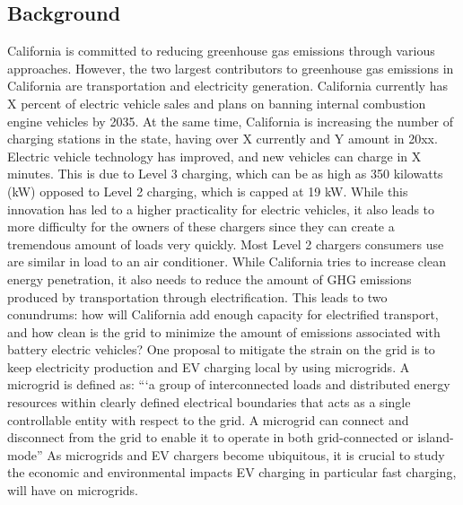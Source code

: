 \documentclass[conference]{IEEEtran}
\begin{document}
    \subsection{Background}
	California is committed to reducing greenhouse gas emissions through various approaches. However, the two largest contributors to greenhouse gas emissions in California are transportation and electricity generation. California currently has X percent of electric vehicle sales and plans on banning internal combustion engine vehicles by 2035. At the same time, California is increasing the number of charging stations in the state, having over X currently and Y amount in 20xx. Electric vehicle technology has improved, and new vehicles can charge in X minutes. This is due to Level 3 charging, which can be as high as 350 kilowatts (kW) opposed to Level 2 charging, which is capped at 19 kW. While this innovation has led to a higher practicality for electric vehicles, it also leads to more difficulty for the owners of these chargers since they can create a tremendous amount of loads very quickly. Most Level 2 chargers consumers use are similar in load to an air conditioner. While California tries to increase clean energy penetration, it also needs to reduce the amount of GHG emissions produced by transportation through electrification. This leads to two conundrums: how will California add enough capacity for electrified transport, and how clean is the grid to minimize the amount of emissions associated with battery electric vehicles? One proposal to mitigate the strain on the grid is to keep electricity production and EV charging local by using microgrids. A microgrid is defined as: “‘a group of interconnected loads and distributed energy resources within clearly defined electrical boundaries that acts as a single controllable entity with respect to the grid. A microgrid can connect and disconnect from the grid to enable it to operate in both grid-connected or island-mode” As microgrids and EV chargers become ubiquitous, it is crucial to study the economic and environmental impacts EV charging in particular fast charging, will have on microgrids.
\end{document}
